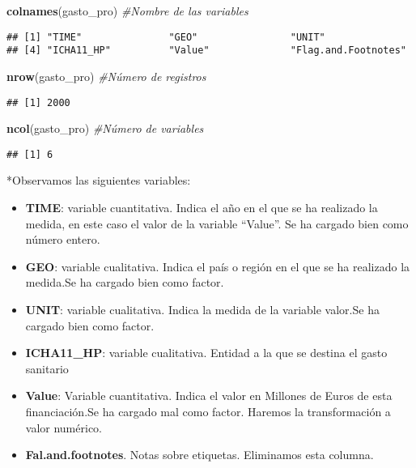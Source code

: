 \documentclass[]{article}
\newenvironment{Shaded}{\begin{snugshade}}{\end{snugshade}}
\newcommand{\CommentTok}[1]{\textcolor[rgb]{0.56,0.35,0.01}{\textit{#1}}}
\newcommand{\KeywordTok}[1]{\textcolor[rgb]{0.13,0.29,0.53}{\textbf{#1}}}
\newcommand{\NormalTok}[1]{#1}
\providecommand{\tightlist}{%
  \setlength{\itemsep}{0pt}\setlength{\parskip}{0pt}}
\begin{document}
\begin{Shaded}
\begin{Highlighting}[]
\KeywordTok{colnames}\NormalTok{(gasto_pro) }\CommentTok{#Nombre de las variables}
\end{Highlighting}
\end{Shaded}

\begin{verbatim}
## [1] "TIME"               "GEO"                "UNIT"              
## [4] "ICHA11_HP"          "Value"              "Flag.and.Footnotes"
\end{verbatim}

\begin{Shaded}
\begin{Highlighting}[]
\KeywordTok{nrow}\NormalTok{(gasto_pro) }\CommentTok{#Número de registros}
\end{Highlighting}
\end{Shaded}

\begin{verbatim}
## [1] 2000
\end{verbatim}

\begin{Shaded}
\begin{Highlighting}[]
\KeywordTok{ncol}\NormalTok{(gasto_pro) }\CommentTok{#Número de variables}
\end{Highlighting}
\end{Shaded}

\begin{verbatim}
## [1] 6
\end{verbatim}

*Observamos las siguientes variables:

\begin{itemize}
\tightlist
\item
  \textbf{TIME}: variable cuantitativa. Indica el año en el que se ha
  realizado la medida, en este caso el valor de la variable ``Value''.
  Se ha cargado bien como número entero.
\item
  \textbf{GEO}: variable cualitativa. Indica el país o región en el que
  se ha realizado la medida.Se ha cargado bien como factor.
\item
  \textbf{UNIT}: variable cualitativa. Indica la medida de la variable
  valor.Se ha cargado bien como factor.
\item
  \textbf{ICHA11\_HP}: variable cualitativa. Entidad a la que se destina
  el gasto sanitario
\item
  \textbf{Value}: Variable cuantitativa. Indica el valor en Millones de
  Euros de esta financiación.Se ha cargado mal como factor. Haremos la
  transformación a valor numérico.
\item
  \textbf{Fal.and.footnotes}. Notas sobre etiquetas. Eliminamos esta
  columna.
\end{itemize}
\end{document}
